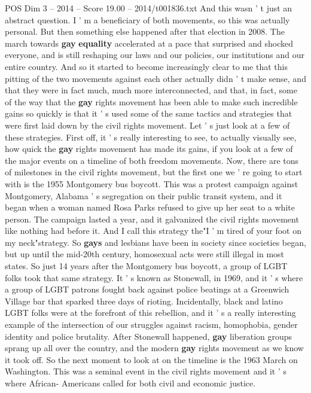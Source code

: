\begin{textsample}{POS Dim 3 – 2014 – Score 19.00 – 2014/t001836.txt}
And this wasn ' t just an abstract question.
I ' m a beneficiary of both movements, so this was actually personal.
But then something else happened after that election in 2008.
The march towards \textbf{gay} \textbf{equality} accelerated at a pace that surprised and shocked everyone, and is still reshaping our laws and our policies, our institutions and our entire country.
And so it started to become increasingly clear to me that this pitting of the two movements against each other actually didn ' t make sense, and that they were in fact much, much more interconnected, and that, in fact, some of the way that the \textbf{gay} rights movement has been able to make such incredible gains so quickly is that it ' s used some of the same tactics and strategies that were first laid down by the civil rights movement.
Let ' s just look at a few of these strategies.
First off, it ' s really interesting to see, to actually visually see, how quick the \textbf{gay} rights movement has made its gains, if you look at a few of the major events on a timeline of both freedom movements.
Now, there are tons of milestones in the civil rights movement, but the first one we ' re going to start with is the 1955 Montgomery bus boycott.
This was a protest campaign against Montgomery, Alabama ' s segregation on their public transit system, and it began when a woman named Rosa Parks refused to give up her seat to a white person.
The campaign lasted a year, and it galvanized the civil rights movement like nothing had before it.
And I call this strategy the"I ' m tired of your foot on my neck"strategy.
So \textbf{gays} and lesbians have been in society since societies began, but up until the mid-20th century, homosexual acts were still illegal in most states.
So just 14 years after the Montgomery bus boycott, a group of LGBT folks took that same strategy.
It ' s known as Stonewall, in 1969, and it ' s where a group of LGBT patrons fought back against police beatings at a Greenwich Village bar that sparked three days of rioting.
Incidentally, black and latino LGBT folks were at the forefront of this rebellion, and it ' s a really interesting example of the intersection of our struggles against racism, homophobia, gender identity and police brutality.
After Stonewall happened, \textbf{gay} liberation groups sprang up all over the country, and the modern \textbf{gay} rights movement as we know it took off.
So the next moment to look at on the timeline is the 1963 March on Washington.
This was a seminal event in the civil rights movement and it ' s where African- Americans called for both civil and economic justice.

\end{textsample}
